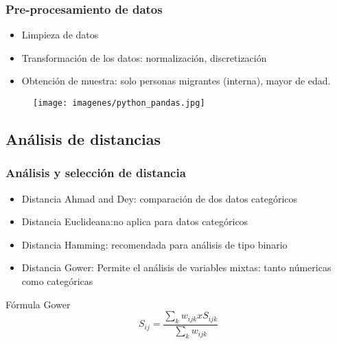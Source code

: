\documentclass[hyperref={pdfpagelabels=false}]{beamer}
\begin{document}
\begin{frame}
\frametitle{Pre-procesamiento de datos}
\begin{itemize}
\item Limpieza de datos
\item Transformaci\'on de los datos: normalizaci\'on, discretizaci\'on
\item Obtenci\'on de muestra: solo personas migrantes (interna), mayor de edad.
\end{itemize}
\begin{figure}
        \begin{center}
            \texttt{[image: imagenes/python\_pandas.jpg]}
        \end{center}
    \end{figure}  
\end{frame}


\subsection{An\'alisis de distancias}
\begin{frame}
\frametitle{An\'alisis y selecci\'on de distancia}
\begin{itemize}
\item Distancia Ahmad and Dey: comparaci\'on de dos datos categ\'oricos \pause
\item Distancia Euclideana:no aplica para datos categ\'oricos \pause
\item Distancia Hamming: recomendada para an\'alisis de tipo binario \pause
\item Distancia Gower: Permite el an\'alisis de variables mixtas: tanto n\'umericas como categ\'oricas
\end{itemize}

\begin{exampleblock}{F\'ormula Gower}
\[
S_{ij} = \frac{\sum_k w_{ijk} x S_{ijk}}{\sum_k w_{ijk}}
\]
\end{exampleblock}

\end{frame}
\end{document}

